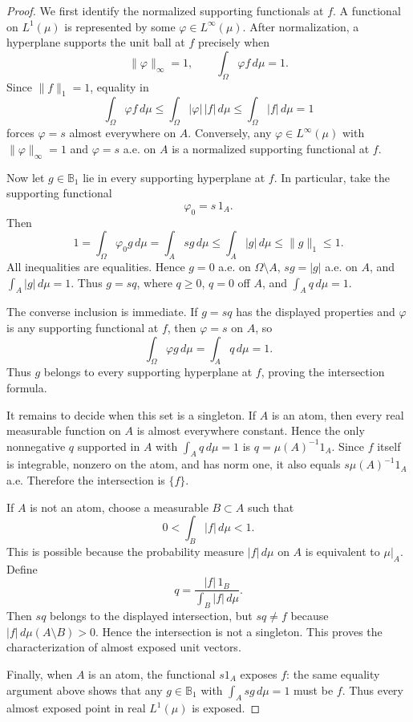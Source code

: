 \documentclass[11pt]{article}
\newcommand{\B}{\mathbb{B}}
\begin{document}
\begin{proof}
We first identify the normalized supporting functionals at \(f\). A functional
on \(L^1(\mu)\) is represented by some \(\varphi\in L^\infty(\mu)\). After
normalization, a hyperplane supports the unit ball at \(f\) precisely when
\[
   \|\varphi\|_\infty=1,\qquad \int_\Omega \varphi f\,d\mu=1.
\]
Since \(\|f\|_1=1\), equality in
\[
   \int_\Omega \varphi f\,d\mu \leq
   \int_\Omega |\varphi|\,|f|\,d\mu \leq \int_\Omega |f|\,d\mu =1
\]
forces \(\varphi=s\) almost everywhere on \(A\). Conversely, any
\(\varphi\in L^\infty(\mu)\) with \(\|\varphi\|_\infty=1\) and
\(\varphi=s\) a.e. on \(A\) is a normalized supporting functional at \(f\).

Now let \(g\in \B_1\) lie in every supporting hyperplane at \(f\). In
particular, take the supporting functional
\[
  \varphi_0=s\,1_A .
\]
Then
\[
   1=\int_\Omega \varphi_0 g\,d\mu
     =\int_A s g\,d\mu
     \leq \int_A |g|\,d\mu
     \leq \|g\|_1
     \leq 1 .
\]
All inequalities are equalities. Hence \(g=0\) a.e. on
\(\Omega\setminus A\), \(s g=|g|\) a.e. on \(A\), and
\(\int_A |g|\,d\mu=1\). Thus \(g=sq\), where \(q\ge 0\), \(q=0\) off \(A\),
and \(\int_A q\,d\mu=1\).

The converse inclusion is immediate. If \(g=sq\) has the displayed properties
and \(\varphi\) is any supporting functional at \(f\), then \(\varphi=s\) on
\(A\), so
\[
   \int_\Omega \varphi g\,d\mu=\int_A q\,d\mu=1.
\]
Thus \(g\) belongs to every supporting hyperplane at \(f\), proving the
intersection formula.

It remains to decide when this set is a singleton. If \(A\) is an atom, then
every real measurable function on \(A\) is almost everywhere constant. Hence
the only nonnegative \(q\) supported in \(A\) with \(\int_A q\,d\mu=1\) is
\(q=\mu(A)^{-1}1_A\). Since \(f\) itself is integrable, nonzero on the atom,
and has norm one, it also equals \(s\mu(A)^{-1}1_A\) a.e. Therefore the
intersection is \(\{f\}\).

If \(A\) is not an atom, choose a measurable \(B\subset A\) such that
\[
   0<\int_B |f|\,d\mu<1.
\]
This is possible because the probability measure \(|f|\,d\mu\) on \(A\) is
equivalent to \(\mu|_A\). Define
\[
   q=\frac{|f|\,1_B}{\int_B |f|\,d\mu}.
\]
Then \(sq\) belongs to the displayed intersection, but \(sq\ne f\) because
\(|f|\,d\mu(A\setminus B)>0\). Hence the intersection is not a singleton.
This proves the characterization of almost exposed unit vectors.

Finally, when \(A\) is an atom, the functional \(s1_A\) exposes \(f\): the
same equality argument above shows that any \(g\in \B_1\) with
\(\int_A s g\,d\mu=1\) must be \(f\). Thus every almost exposed point in
real \(L^1(\mu)\) is exposed.
\end{proof}
\end{document}
